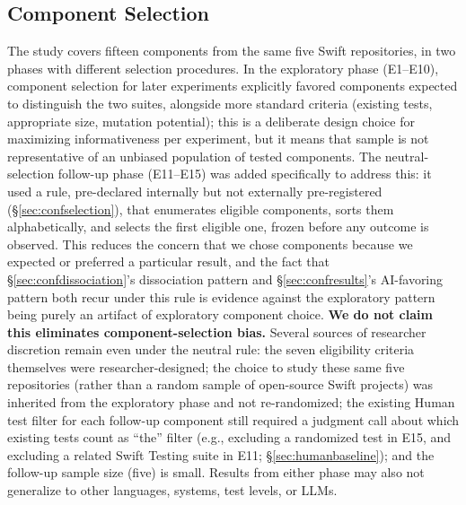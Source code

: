 \documentclass[10pt,conference]{IEEEtran}
\begin{document}
\subsection{Component Selection}
\label{sec:threatscomponent}
The study covers fifteen components from the same five Swift repositories, in two phases with different selection procedures. In the exploratory phase (E1--E10), component selection for later experiments explicitly favored components expected to distinguish the two suites, alongside more standard criteria (existing tests, appropriate size, mutation potential); this is a deliberate design choice for maximizing informativeness per experiment, but it means that sample is not representative of an unbiased population of tested components. The neutral-selection follow-up phase (E11--E15) was added specifically to address this: it used a rule, pre-declared internally but not externally pre-registered (\S\ref{sec:confselection}), that enumerates eligible components, sorts them alphabetically, and selects the first eligible one, frozen before any outcome is observed. This reduces the concern that we chose components because we expected or preferred a particular result, and the fact that \S\ref{sec:confdissociation}'s dissociation pattern and \S\ref{sec:confresults}'s AI-favoring pattern both recur under this rule is evidence against the exploratory pattern being purely an artifact of exploratory component choice. \textbf{We do not claim this eliminates component-selection bias.} Several sources of researcher discretion remain even under the neutral rule: the seven eligibility criteria themselves were researcher-designed; the choice to study these same five repositories (rather than a random sample of open-source Swift projects) was inherited from the exploratory phase and not re-randomized; the existing Human test filter for each follow-up component still required a judgment call about which existing tests count as ``the'' filter (e.g., excluding a randomized test in E15, and excluding a related Swift Testing suite in E11; \S\ref{sec:humanbaseline}); and the follow-up sample size (five) is small. Results from either phase may also not generalize to other languages, systems, test levels, or LLMs.
\end{document}
